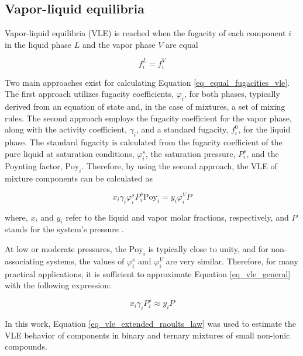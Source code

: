\label{sec:methods}

\subsection{Vapor-liquid equilibria}

Vapor-liquid equilibria (VLE) is reached when the fugacity of each component $i$ in the liquid phase $L$ and the vapor phase $V$ are equal

\begin{equation}
    f_i^L = f_i^V
    \label{eq_equal_fugacities_vle}
\end{equation}

Two main approaches exist for calculating Equation \ref{eq_equal_fugacities_vle}. The first approach utilizes fugacity coefficients, $\varphi_i$, for both phases, typically derived from an equation of state and, in the case of mixtures, a set of mixing rules. The second approach employs the fugacity coefficient for the vapor phase, along with the activity coefficient, $\gamma_i$, and a standard fugacity, $f_i^0$, for the liquid phase. The standard fugacity is calculated from the fugacity coefficient of the pure liquid at saturation conditions, $\varphi^s_i$, the saturation pressure, $P^s_i$, and the Poynting factor, $\text{Poy}_i$. Therefore, by using the second approach, the VLE of mixture components can be calculated as

\begin{equation}
    x_i \gamma_i \varphi_i^s P_i^s \text{Poy}_i = y_i \varphi_i^V P
    \label{eq_vle_general}
\end{equation}

\noindent where, $x_i$ and $y_i$ refer to the liquid and vapor molar fractions, respectively, and $P$ stands for the system's pressure \cite{gmehling2019chemical}. 

At low or moderate pressures, the $\text{Poy}_i$ is typically close to unity, and for non-associating systems, the values of $\varphi_i^s$ and $\varphi_i^V$ are very similar. Therefore, for many practical applications, it is sufficient to approximate Equation \ref{eq_vle_general} with the following expression:

\begin{equation}
    x_i \gamma_i  P_i^s  \approx y_i P
    \label{eq_vle_extended_raoults_law}
\end{equation}

In this work, Equation \ref{eq_vle_extended_raoults_law} was used to estimate the VLE behavior of components in binary and ternary mixtures of small non-ionic compounds. 

